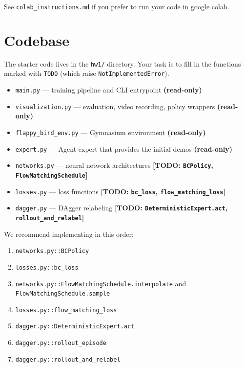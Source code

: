 \documentclass[12pt]{article}
\begin{document}
\noindent See \texttt{colab\_instructions.md} if you prefer to run your code in google colab.

\section*{Codebase}

The starter code lives in the \texttt{hw1/} directory. Your task is to fill in the functions marked with \texttt{TODO} (which raise \texttt{NotImplementedError}).

\begin{itemize}
\item \texttt{main.py} --- training pipeline and CLI entrypoint \textbf{(read-only)}
\item \texttt{visualization.py} --- evaluation, video recording, policy wrappers \textbf{(read-only)}
\item \texttt{flappy\_bird\_env.py} --- Gymnasium environment \textbf{(read-only)}
\item \texttt{expert.py} --- Agent expert that provides the initial demos \textbf{(read-only)}
\item \texttt{networks.py} --- neural network architectures \textbf{[TODO: \texttt{BCPolicy}, \texttt{FlowMatchingSchedule}]}
\item \texttt{losses.py} --- loss functions \textbf{[TODO: \texttt{bc\_loss}, \texttt{flow\_matching\_loss}]}
\item \texttt{dagger.py} --- DAgger relabeling \textbf{[TODO: \texttt{DeterministicExpert.act}, \texttt{rollout\_and\_relabel}]}
\end{itemize}

\noindent We recommend implementing in this order:
\begin{enumerate}
    \item \texttt{networks.py::BCPolicy}
    \item \texttt{losses.py::bc\_loss}
    \item \texttt{networks.py::FlowMatchingSchedule.interpolate} and \texttt{FlowMatchingSchedule.sample}
    \item \texttt{losses.py::flow\_matching\_loss}
    \item \texttt{dagger.py::DeterministicExpert.act}
    \item \texttt{dagger.py::rollout\_episode}
    \item \texttt{dagger.py::rollout\_and\_relabel}
\end{enumerate}


\newpage
\end{document}
